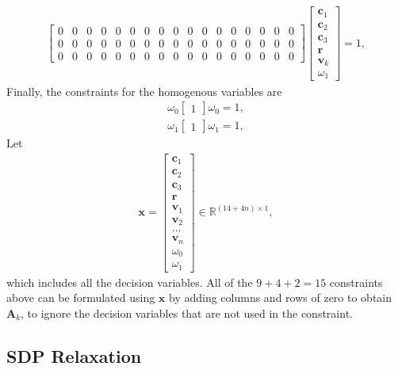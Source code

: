 \documentclass{article}
\begin{document}
\begin{align}
\begin{bmatrix}
        0 & 0 & 0 & 0 & 0 & 0 & 0 & 0 & 0 & 0 & 0 & 0 & 0 & 0 & 0 & 0 & 0 \\
        0 & 0 & 0 & 0 & 0 & 0 & 0 & 0 & 0 & 0 & 0 & 0 & 0 & 0 & 0 & 0 & 0 \\
        0 & 0 & 0 & 0 & 0 & 0 & 0 & 0 & 0 & 0 & 0 & 0 & 0 & 0 & 0 & 0 & 0
    \end{bmatrix}
    \begin{bmatrix}
        \mathbf{c}_1 \\
        \mathbf{c}_2 \\
        \mathbf{c}_3 \\
        \mathbf{r} \\
        \mathbf{v}_k \\
        \omega_1
    \end{bmatrix} = 1,
\end{align}
Finally, the constraints for the homogenous variables are 
\begin{align}
    \omega_0 \begin{bmatrix} 1 \end{bmatrix} \omega_0 = 1,\\
    \omega_1 \begin{bmatrix} 1 \end{bmatrix} \omega_1 = 1,
\end{align}
Let
\begin{align}
\mathbf{x} = \begin{bmatrix} \mathbf{c}_1 \\ \mathbf{c}_2 \\ \mathbf{c}_3 \\ \mathbf{r} \\ \mathbf{v}_1 \\ \mathbf{v}_2 \\ \dots \\ \mathbf{v}_n \\ \omega_0 \\ \omega_1 \end{bmatrix} \in \mathbb{R}^{(14 + 4n) \times 1},
\end{align}
which includes all the decision variables. 
All of the $9 + 4 + 2 = 15$ constraints above can be formulated using $\mathbf{x}$ by adding columns and rows of zero to obtain $\mathbf{A}_k$, to ignore the decision variables that are not used in the constraint. 

\subsection{SDP Relaxation}
\end{document}
